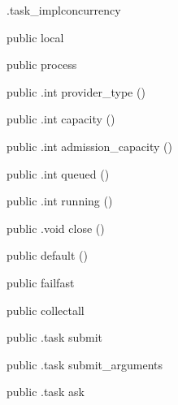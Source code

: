 \begin{CrexxClass}{.task\_impl}{concurrency}

  \begin{Hierarchy}
  \end{Hierarchy}

  \begin{Members}

    \Factory
      {public}
      {local}
      {}

    \Factory
      {public}
      {process}
      {}

    \Method
      {public}
      {.int}
      {provider\_type}
      {()}

    \Method
      {public}
      {.int}
      {capacity}
      {()}

    \Method
      {public}
      {.int}
      {admission\_capacity}
      {()}

    \Method
      {public}
      {.int}
      {queued}
      {()}

    \Method
      {public}
      {.int}
      {running}
      {()}

    \Method
      {public}
      {.void}
      {close}
      {()}

    \Factory
      {public}
      {default}
      {()}

    \Factory
      {public}
      {failfast}
      {}

    \Factory
      {public}
      {collectall}
      {}

    \Method
      {public}
      {.task}
      {submit}
      {}

    \Method
      {public}
      {.task}
      {submit\_arguments}
      {}

    \Method
      {public}
      {.task}
      {ask}
      {}


\end{Members}
\end{CrexxClass}

